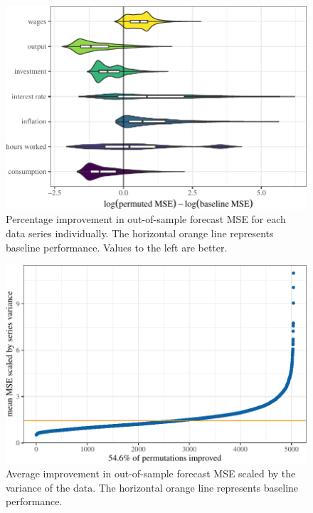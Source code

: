 \documentclass[11pt]{article}
\begin{document}
\begin{figure}[t]

{\centering \includegraphics{gfx/series-percent-improvement-1} 

}

\caption{Percentage improvement in out-of-sample forecast MSE for each data series individually. The horizontal orange line represents baseline performance. Values to the left are better.}\label{fig:series-percent-improvement}
\end{figure}

\begin{figure}[t]

{\centering \includegraphics{gfx/mean-scaled-mse-1} 

}

\caption{Average improvement in out-of-sample forecast MSE scaled by the variance of the data. The horizontal orange line represents baseline performance.}\label{fig:mean-scaled-mse}
\end{figure}
\end{document}
